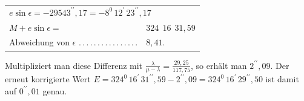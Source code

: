 \begin{center}
\begin{tabular}{@{}ll@{}}
\multicolumn{2}{l}{$e\sin\epsilon=-29543^{\prime\prime}{,}17=-8^0\,12^{\prime}\,23^{\prime\prime}{,}17$}\\[.3em]
$M+e\sin\epsilon=$ & $324\ \ 16\ \ 31{,}59$\\[.3em]
Abweichung von $\epsilon$ .\,.\,.\,.\,.\,.\,.\,.\,.\,.\,.\,.\,.\,.\,.\,. & $8{,}41$.
\end{tabular}
\end{center}
\noindent Multipliziert man diese Differenz mit $\frac{\lambda}{\mu-\lambda}=\frac{29{,}25}{117{,}75}$, so erhält man $2^{\prime\prime}{,}09$. Der erneut korrigierte Wert $E=324^0\,16^{\prime}\,31^{\prime\prime}{,}59-2^{\prime\prime}{,}09=324^0\,16^{\prime}\,29^{\prime\prime}{,}50$ ist damit auf $0^{\prime\prime}{,}01$ genau.

